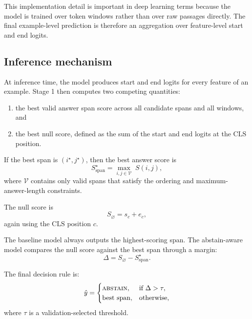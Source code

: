 This implementation detail is important in deep learning terms because the
model is trained over token windows rather than over raw passages directly.
The final example-level prediction is therefore an aggregation over
feature-level start and end logits.

\subsection{Inference mechanism}

At inference time, the model produces start and end logits for every feature of
an example.
Stage 1 then computes two competing quantities:
\begin{enumerate}[leftmargin=1.25em]
  \item the best valid answer span score across all candidate spans and all
  windows, and
  \item the best null score, defined as the sum of the start and end logits at
  the \(\mathrm{CLS}\) position.
\end{enumerate}

If the best span is \((i^\star, j^\star)\), then the best answer score is
\begin{equation}
  S_{\mathrm{span}}^\star
  =
  \max_{i, j \in \mathcal{V}} \; S(i, j),
\end{equation}
where \(\mathcal{V}\) contains only valid spans that satisfy the ordering and
maximum-answer-length constraints.

The null score is
\begin{equation}
  S_{\varnothing}
  =
  s_c + e_c,
\end{equation}
again using the \(\mathrm{CLS}\) position \(c\).

The baseline model always outputs the highest-scoring span.
The abstain-aware model compares the null score against the best span through a
margin:
\begin{equation}
  \Delta = S_{\varnothing} - S_{\mathrm{span}}^\star.
\end{equation}

The final decision rule is:
\begin{equation}
  \hat{y}
  =
  \begin{cases}
    \textsc{abstain}, & \text{if } \Delta > \tau, \\
    \text{best span}, & \text{otherwise,}
  \end{cases}
\end{equation}
where \(\tau\) is a validation-selected threshold.

